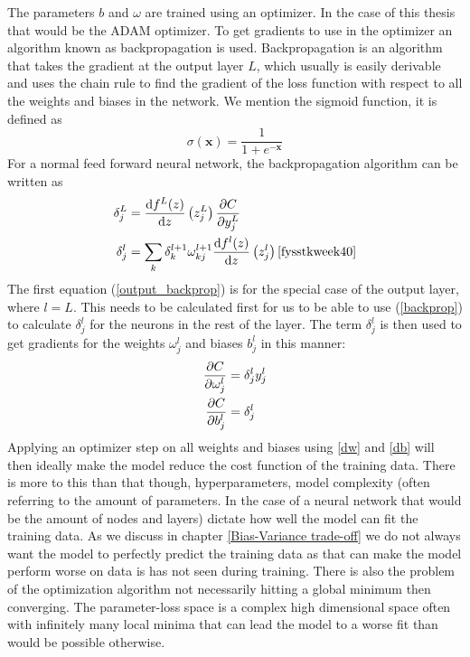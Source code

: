 The parameters $b$ and $\omega$ are trained using an optimizer. In the case of this 
thesis that would be the ADAM optimizer. To get gradients to use in the optimizer 
an algorithm known as backpropagation is used. Backpropagation is an algorithm that 
takes the gradient at the output layer $L$, which usually is easily derivable and 
uses the chain rule to find the gradient of the loss function with respect to all 
the weights and biases in the network.
We mention the sigmoid function, it is defined as
\begin{equation}
	\sigma(\bm{x}) = \frac{1}{1 + e^{-\bm{x}}} \label{sigmoid}
\end{equation}
For a normal feed forward neural network, the backpropagation algorithm can be written 
as 
\begin{align}
    \delta^L_j &= \dv{f^L(z)}{z}\left(z^L_j\right) \pdv{C}{y^L_j} \label{output_backprop}\\
    \delta^l_j &= \sum_k \delta^{l+1}_k \omega^{l+1}_{kj} \dv{f^l(z)}{z}\left(z^l_j\right) \cite{fysstkweek40} \label{backprop}
\end{align}
The first equation (\ref{output_backprop}) is for the special case of the output 
layer, where $l=L$. This needs to be calculated first for us to be able to use 
(\ref{backprop}) to calculate $\delta^l_j$ for the neurons in the rest of the layer. 
The term $\delta^l_j$ is then used to get gradients for the weights $\omega^l_j$ 
and biases $b^l_j$ in this manner:
\begin{align}
    \pdv{C}{\omega^l_j} &= \delta^l_j y^l_j \label{dw}\\
    \pdv{C}{b^l_j} &= \delta^l_j \label{db}
\end{align}
Applying an optimizer step on all weights and biases using \ref{dw} and \ref{db}
will then ideally make the model reduce the cost function of the training data.
There is more to this than that though, hyperparameters, model complexity (often 
referring to the amount of parameters. In the case of a neural network that would 
be the amount of nodes and layers) dictate how well the model can fit the training 
data. As we discuss in chapter \ref{Bias-Variance trade-off} we do not always want 
the model to perfectly predict the training data as that can make the model perform 
worse on data is has not seen during training. There is also the problem of the 
optimization algorithm not necessarily hitting a global minimum then converging. 
The parameter-loss space is a complex high dimensional space often with infinitely 
many local minima that can lead the model to a worse fit than would be possible 
otherwise. \citationneeded
